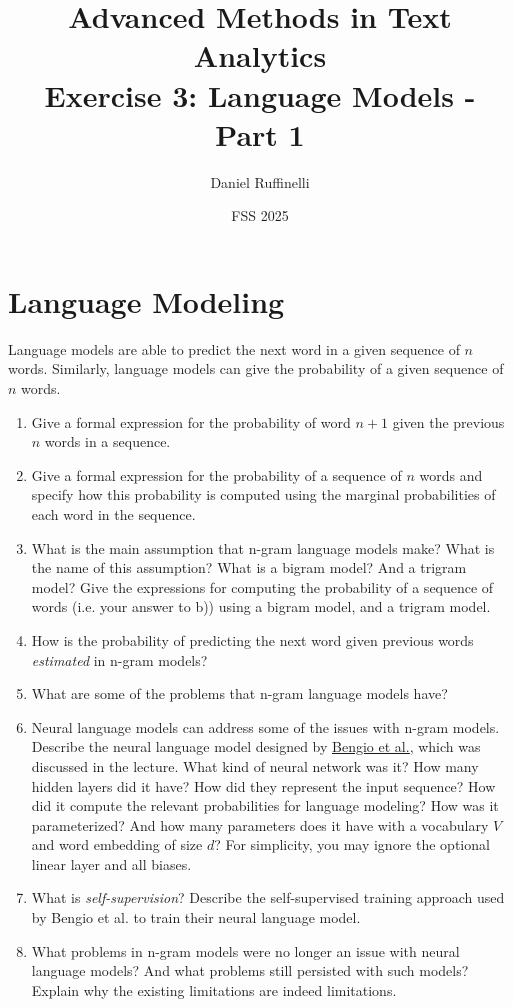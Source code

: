 \documentclass[11pt,a4paper]{article}
\title{Advanced Methods in Text Analytics \\ 
Exercise 3: Language Models - Part 1}
\author{Daniel Ruffinelli}
\date{FSS 2025}
\begin{document}
\maketitle

\section{Language Modeling}

Language models are able to predict the next word in a given sequence of $n$
words. Similarly, language models can give the probability of a given
sequence of $n$ words.

\begin{enumerate}[label=(\alph*)]
    \item Give a formal expression for the probability of word $n+1$ given the
          previous $n$ words in a sequence.
    \item Give a formal expression for the probability of a sequence of $n$
          words and specify how this probability is computed using the marginal
          probabilities of each word in the sequence.
    \item What is the main assumption that n-gram language models make?
          What is the name of this assumption?
          What is a bigram model? And a trigram model?
          Give the expressions for computing the probability of a sequence of
          words (i.e. your answer to b)) using a bigram model, and a trigram
          model.
    \item How is the probability of predicting the next word given previous
          words \emph{estimated} in n-gram models?
    \item What are some of the problems that n-gram language models have?
    \item Neural language models can address some of the issues with n-gram
          models.
          Describe the neural language model designed by
          \href{https://www.jmlr.org/papers/volume3/bengio03a/bengio03a.pdf}{\underline{Bengio et al.}},
          which was discussed in the lecture.
          What kind of neural network was it? How many hidden layers did it
          have? How did they represent the input sequence? How did it compute
          the relevant probabilities for language modeling?
          How was it parameterized? And how many parameters does it have with a
          vocabulary $V$ and word embedding of size $d$?
          For simplicity, you may ignore the optional linear layer and all
          biases.
    \item What is \emph{self-supervision}? Describe the self-supervised training
          approach used by Bengio et al. to train their neural language model.
    \item What problems in n-gram models were no longer an issue with neural
          language models? And what problems still persisted with such models?
          Explain why the existing limitations are indeed limitations.
\end{enumerate}
\end{document}
